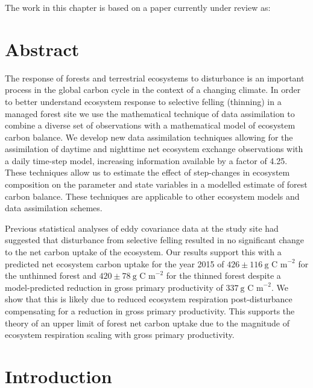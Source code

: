 
The work in this chapter is based on a paper currently under review as: 

\section{Abstract}
The response of forests and terrestrial ecosystems to disturbance is an important process in the global carbon cycle in the context of a changing climate. In order to better understand ecosystem response to selective felling (thinning) in a managed forest site we use the mathematical technique of data assimilation to combine a diverse set of observations with a mathematical model of ecosystem carbon balance. We develop new data assimilation techniques allowing for the assimilation of daytime and nighttime net ecosystem exchange observations with a daily time-step model, increasing information available by a factor of 4.25. These techniques allow us to estimate the effect of step-changes in ecosystem composition on the parameter and state variables in a modelled estimate of forest carbon balance. These techniques are applicable to other ecosystem models and data assimilation schemes. 

Previous statistical analyses of eddy covariance data at the study site had suggested that disturbance from selective felling resulted in no significant change to the net carbon uptake of the ecosystem. Our results support this with a predicted net ecosystem carbon uptake for the year 2015 of \(426 \pm 116~\text{g C m}^{-2}\) for the unthinned forest and \(420 \pm 78~\text{g C m}^{-2}\) for the thinned forest despite a model-predicted reduction in gross primary productivity of \(337~\text{g C m}^{-2}\). We show that this is likely due to reduced ecosystem respiration post-disturbance compensating for a reduction in gross primary productivity. This supports the theory of an upper limit of forest net carbon uptake due to the magnitude of ecosystem respiration scaling with gross primary productivity. 


\section{Introduction}

